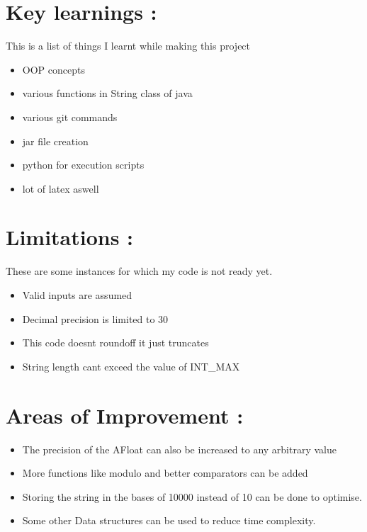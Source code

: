 \documentclass{article}
\begin{document}
\section{Key learnings :}
This is a list of things I learnt while making this project
\begin{itemize}
    \item OOP concepts 
    \item various functions in String class of java
    \item various git commands
    \item jar file creation
    \item python for execution scripts
    \item lot of latex aswell
    
\end{itemize}

\section{Limitations :}
These are some instances for which my code is not ready yet.
\begin{itemize}
    \item Valid inputs are assumed 
    \item Decimal precision is limited to 30
    \item This code doesnt roundoff it just truncates
    \item String length cant exceed the value of INT\_MAX
\end{itemize}

\section{Areas of Improvement :}
\begin{itemize}
    \item The precision of the AFloat can also be increased to any arbitrary value
    \item More functions like modulo and better comparators can be added
    \item Storing the string in the bases of 10000 instead of 10 can be done to optimise.
    \item Some other Data structures can be used to reduce time complexity.
\end{itemize}
\end{document}
